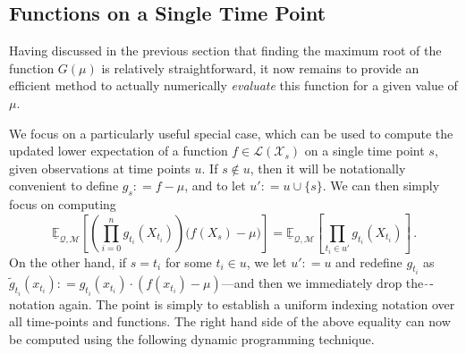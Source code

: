 \documentclass[twoside,11pt]{article}
\newcommand{\states}{\mathcal{X}}
\newcommand{\lexp}{\underline{\mathbb{E}}_{\rateset,\mathcal{M}}}
\newcommand{\gambles}{\mathcal{L}}
\newcommand{\rateset}{\mathcal{Q}}
\newcommand{\coloneqq}{:\!=}
\begin{document}
\subsection{Functions on a Single Time Point}\label{sec:funcs_single_time}

Having discussed in the previous section that finding the maximum root of the function $G(\mu)$ is relatively straightforward, it now remains to provide an efficient method to actually numerically \emph{evaluate} this function for a given value of $\mu$.

We focus on a particularly useful special case, which can be used to compute the updated lower expectation of a function $f\in\gambles(\states_s)$ on a single time point $s$, given observations at time points $u$. If $s\notin u$, then it will be notationally convenient to define $g_s\coloneqq f - \mu$, and to let $u'\coloneqq u\cup \{s\}$. We can then simply focus on computing
\begin{equation*}
\lexp\left[ \left(\prod_{i=0}^ng_{t_i}(X_{t_i})\right)\bigl(f(X_s) - \mu\bigr) \right] = \lexp\left[ \prod_{t_i\in u'}g_{t_i}(X_{t_i})\right]\,.
\end{equation*}
On the other hand, if $s = t_i$ for some $t_i\in u$, we let $u'\coloneqq u$ and redefine $g_{t_i}$ as $\tilde{g}_{t_i}(x_{t_i})\coloneqq g_{t_i}(x_{t_i})\cdot (f(x_{t_i})-\mu)$---and then we immediately drop the $\tilde\,$-notation again. The point is simply to establish a uniform indexing notation over all time-points and functions. The right hand side of the above equality can now be computed using the following dynamic programming technique. 
\end{document}
